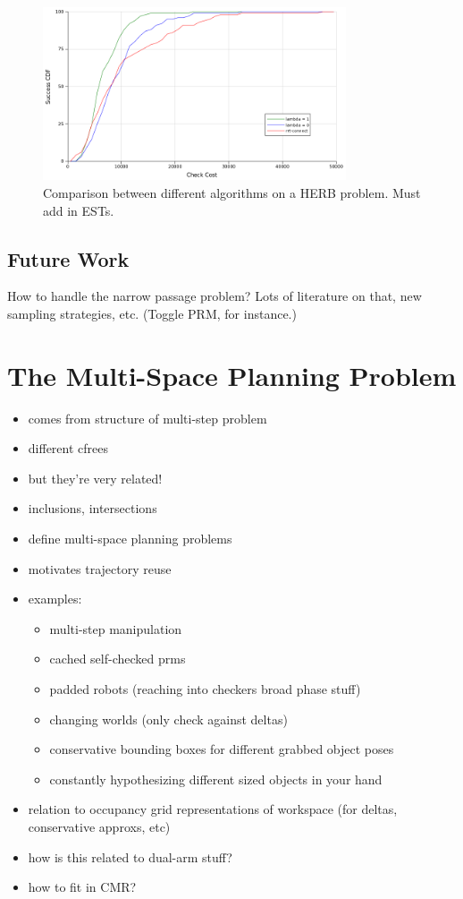 \documentclass{article}
\begin{document}
\begin{figure}
\centering
\includegraphics[width=0.8\textwidth]{figs/timegreedy-herbstep1-comparison-cdfs.png}
\caption{Comparison between different algorithms on a HERB problem.
   Must add in ESTs.}
\label{fig:herb-comparison-cdfs}
\end{figure}

\subsection{Future Work}

How to handle the narrow passage problem?
Lots of literature on that, new sampling strategies, etc.
(Toggle PRM, for instance.)



\newpage
\section{The Multi-Space Planning Problem}
\label{sec:multispace}

\begin{itemize}
\item comes from structure of multi-step problem
\item different cfrees
\item but they're very related!
\item inclusions, intersections
\item define multi-space planning problems
\item motivates trajectory reuse
\item examples:
   \begin{itemize}
   \item multi-step manipulation
   \item cached self-checked prms
   \item padded robots (reaching into checkers broad phase stuff)
   \item changing worlds (only check against deltas)
   \item conservative bounding boxes for different grabbed object poses
   \item constantly hypothesizing different sized objects in your hand
   \end{itemize}
\item relation to occupancy grid representations of workspace
   (for deltas, conservative approxs, etc)
\item how is this related to dual-arm stuff?
\item how to fit in CMR?
\end{itemize}
\end{document}
